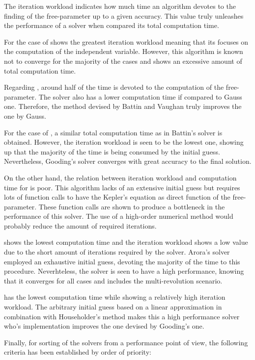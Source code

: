 The iteration workload indicates how much time an algorithm devotes to the
finding of the free-parameter up to a given accuracy. This value truly unleashes
the performance of a solver when compared its total computation time. 

For the case of \cite{gauss1809} shows the greatest iteration workload meaning that
its focuses on the computation of the independent variable. However, this
algorithm is known not to converge for the majority of the cases and shows an
excessive amount of total computation time.

Regarding \cite{battin1984}, around half of the time is devoted to the
computation of the free-parameter. The solver also has a lower computation time
if compared to Gauss one. Therefore, the method devised by Battin and Vaughan
truly improves the one by Gauss.

For the case of \cite{gooding1990}, a similar total computation time as in
Battin's solver is obtained. However, the iteration workload is seen to be the
lowest one, showing up that the majority of the time is being consumed by the
initial guess. Nevertheless, Gooding's solver converges with great accuracy to
the final solution.

On the other hand, the relation between iteration workload and computation time
for \cite{avanzini2008} is poor. This algorithm lacks of an extensive initial
guess but requires lots of function calls to have the Kepler's equation as
direct function of the free-parameter. These function calls are shown to produce
a bottleneck in the performance of this solver. The use of a high-order
numerical method would probably reduce the amount of required iterations.

\cite{arora2013} shows the lowest computation time and the iteration workload
shows a low value due to the short amount of iterations required by the solver.
Arora's solver employed an exhaustive initial guess, devoting the majority of
the time to this procedure. Neverhteless, the solver is seen to have a high
performance, knowing that it converges for all cases and includes the
multi-revolution scenario. 

\cite{izzo2015} has the lowest computation time while showing a
relatively high iteration workload. The arbitrary initial guess based on a
linear approximation in combination with Householder's method makes this a high
performance solver who's implementation improves the one devised by Gooding's one.

Finally, for sorting of the solvers from a performance point of view, the
following criteria has been established by order of priority:

